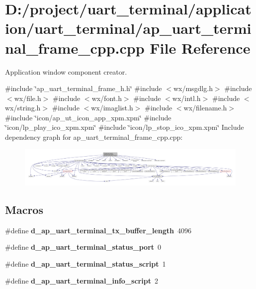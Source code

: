 \section{D\+:/project/uart\+\_\+terminal/application/uart\+\_\+terminal/ap\+\_\+uart\+\_\+terminal\+\_\+frame\+\_\+cpp.cpp File Reference}
\label{ap__uart__terminal__frame__cpp_8cpp}


Application window component creator.  


{\ttfamily \#include \char`\"{}ap\+\_\+uart\+\_\+terminal\+\_\+frame\+\_\+h.\+h\char`\"{}}\newline
{\ttfamily \#include $<$wx/msgdlg.\+h$>$}\newline
{\ttfamily \#include $<$wx/file.\+h$>$}\newline
{\ttfamily \#include $<$wx/font.\+h$>$}\newline
{\ttfamily \#include $<$wx/intl.\+h$>$}\newline
{\ttfamily \#include $<$wx/string.\+h$>$}\newline
{\ttfamily \#include $<$wx/imaglist.\+h$>$}\newline
{\ttfamily \#include $<$wx/filename.\+h$>$}\newline
{\ttfamily \#include \char`\"{}icon/ap\+\_\+ut\+\_\+icon\+\_\+app\+\_\+xpm.\+xpm\char`\"{}}\newline
{\ttfamily \#include \char`\"{}icon/lp\+\_\+play\+\_\+ico\+\_\+xpm.\+xpm\char`\"{}}\newline
{\ttfamily \#include \char`\"{}icon/lp\+\_\+stop\+\_\+ico\+\_\+xpm.\+xpm\char`\"{}}\newline
Include dependency graph for ap\+\_\+uart\+\_\+terminal\+\_\+frame\+\_\+cpp.\+cpp\+:\nopagebreak
\begin{figure}[H]
\begin{center}
\leavevmode
\includegraphics[width=350pt]{ap__uart__terminal__frame__cpp_8cpp__incl}
\end{center}
\end{figure}
\subsection*{Macros}
\begin{DoxyCompactItemize}
\item 
\#define \textbf{ d\+\_\+ap\+\_\+uart\+\_\+terminal\+\_\+tx\+\_\+buffer\+\_\+length}~4096
\item 
\#define {\bfseries d\+\_\+ap\+\_\+uart\+\_\+terminal\+\_\+status\+\_\+port}~0
\item 
\#define {\bfseries d\+\_\+ap\+\_\+uart\+\_\+terminal\+\_\+status\+\_\+script}~1
\item 
\#define {\bfseries d\+\_\+ap\+\_\+uart\+\_\+terminal\+\_\+info\+\_\+script}~2
\end{DoxyCompactItemize}


